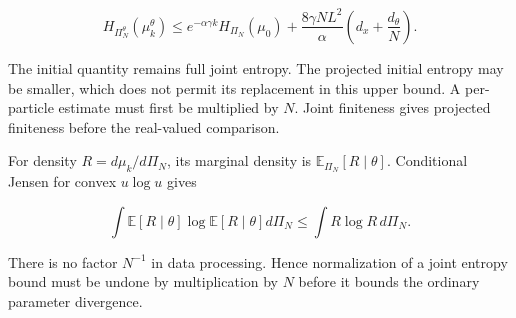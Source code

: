 \documentclass[11pt,a4paper]{article}
\begin{document}
\[H_{\Pi_N^\theta}(\mu_k^\theta)
\le e^{-\alpha\gamma k}H_{\Pi_N}(\mu_0)
+\frac{8\gamma NL^2}{\alpha}\left(d_x+\frac{d_\theta}N\right).\]

The initial quantity remains full joint entropy. The projected initial entropy may be smaller, which does not permit its replacement in this upper bound. A per-particle estimate must first be multiplied by \(N\). Joint finiteness gives projected finiteness before the real-valued comparison.



For density \(R=d\mu_k/d\Pi_N\), its marginal density is \(\mathbb E_{\Pi_N}[R\mid\theta]\). Conditional Jensen for convex \(u\log u\) gives

\[\int\mathbb E[R\mid\theta]\log\mathbb E[R\mid\theta]d\Pi_N
\le\int R\log R\,d\Pi_N.\]

There is no factor \(N^{-1}\) in data processing. Hence normalization of a joint entropy bound must be undone by multiplication by \(N\) before it bounds the ordinary parameter divergence.
\end{document}

